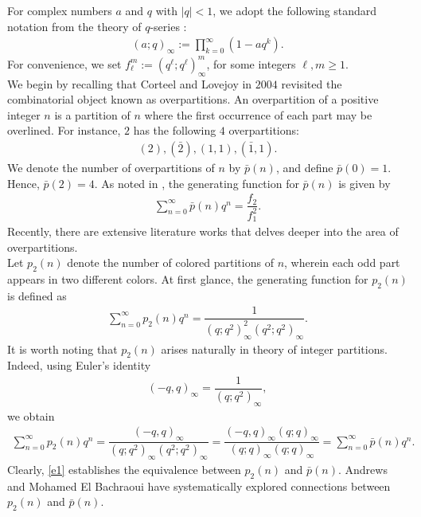 \documentclass[11pt,a4paper]{article}
\numberwithin{equation}{section}
\theoremstyle{plain}
\begin{document}
	For complex numbers $a$ and $q$ with $|q|<1$, we adopt the following standard notation from the theory of $q$-series \cite{gasper}:
	\begin{align*}
		(a;q)_\infty:=\prod_{k=0}^{\infty}(1-aq^k).
	\end{align*}
	For convenience, we set $f_\ell^m:=(q^\ell;q^\ell)^m_\infty$, for some integers $\ell,m\ge 1$.\\
	\indent We begin by recalling that Corteel and Lovejoy \cite{corteel} in $2004$ revisited the combinatorial object known as overpartitions. An overpartition of a positive integer $n$ is a partition of $n$ where the first occurrence of each part may be overlined. For instance, $2$ has the following $4$ overpartitions:
	\begin{align*}
		(2), (\bar{2}), (1,1), (\bar{1},1).	
	\end{align*}
	We denote the number of overpartitions of $n$ by $\bar{p}(n)$, and define $\bar{p}(0)=1$. Hence, $\bar{p}(2)=4$.
	As noted in \cite{corteel}, the generating function for $\bar{p}(n)$ is given by 
	\begin{align}\label{eoverp}
		\sum_{n=0}^{\infty}\bar{p}(n)q^n=\dfrac{f_2}{f_1^2}.
	\end{align}
	Recently, there are extensive literature works that delves deeper into the area of overpartitions.\\
	\indent	Let $p_2(n)$ denote the number of colored partitions of $n$, wherein each odd part appears in two different colors. At first glance, the generating function for $p_2(n)$ is defined as
	\begin{align}\label{e2color}
		\sum_{n=0}^{\infty}p_2(n)q^n=\dfrac{1}{(q;q^2)^2_\infty (q^2;q^2)_\infty}.
	\end{align}
	It is worth noting that $p_2(n)$ arises naturally in theory of integer partitions. Indeed, using Euler's identity
	\begin{align*}
		(-q,q)_\infty= \dfrac{1}{(q;q^2)_\infty},
	\end{align*} 
	we obtain 
	\begin{align}\label{e1}
		\sum_{n=0}^{\infty}p_2(n)q^n=\dfrac{(-q,q)_\infty}{(q;q^2)_\infty (q^2;q^2)_\infty}=\dfrac{(-q,q)_\infty (q;q)_\infty}{(q;q)_\infty (q;q)_\infty}=\sum_{n=0}^{\infty}\bar{p}(n)q^n.	\end{align}
	Clearly, \eqref{e1} establishes the equivalence between $p_2(n)$ and $\bar{p}(n)$. Andrews and Mohamed El Bachraoui \cite{andrew} have systematically explored connections between  $p_2(n)$ and $\bar{p}(n)$.\\
\end{document}
